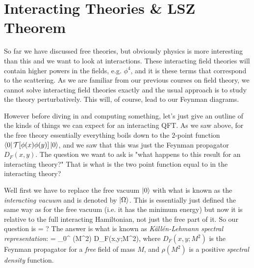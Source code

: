 \chapter{Interacting Theories \& LSZ Theorem}

So far we have discussed free theories, but obviously physics is more interesting than this and we want to look at interactions. These interacting field theories will contain higher powers in the fields, e.g. $\phi^4$, and it is these terms that correspond to the scattering. As we are familiar from our previous courses on field theory, we cannot solve interacting field theories exactly and the usual approach is to study the theory perturbatively. This will, of course, lead to our Feynman diagrams. 

However before diving in and computing something, let's just give an outline of the kinds of things we can expect for an interacting QFT. As we saw above, for the free theory essentially everything boils down to the $2$-point function $\bra{0}\mathcal{T}[\phi(x)\phi(y)]\ket{0}$, and we saw that this was just the Feynman propagator $D_F(x,y)$. The question we want to ask is "what happens to this result for an interacting theory?" That is what is the two point function equal to in the interacting theory? 

Well first we have to replace the free vacuum $\ket{0}$ with what is known as the \textit{interacting vacuum} and is denoted by $\ket{\Omega}$. This is essentially just defined the same way as for the free vacuum (i.e. it has the minimum energy) but now it is relative to the full interacting Hamiltonian, not just the free part of it. So our question is 
\bse 
    \bra{\Omega}\ket{\Omega} = ?
\ese
The answer is what is known as \textit{K\"{a}ll\'{e}n-Lehmann spectral representation}:
\be
\label{eqn:KallenLehmann}
    \bra{\Omega} \ket{\Omega} = \int_0^{\infty}  \rho(M^2) D_F(x,y;M^2),
\ee 
where $D_F(x,y;M^2)$ is the Feynman propagator for a \textit{free} field of mass $M$, and $\rho(M^2)$ is a positive \textit{spectral density} function. 

